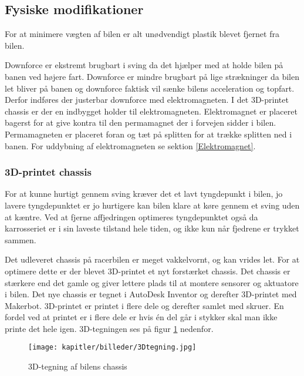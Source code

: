 
\subsection{Fysiske modifikationer}

For at minimere vægten af bilen er alt unødvendigt plastik blevet fjernet fra bilen.

Downforce er ekstremt brugbart i sving da det hjælper med at holde bilen på banen ved højere fart. Downforce er mindre brugbart på lige strækninger da bilen let bliver på banen og downforce faktisk vil sænke bilens acceleration og topfart. Derfor indføres der justerbar downforce med elektromagneten. I det 3D-printet chassis er der en indbygget holder til elektromagneten. Elektromagnet er placeret bagerst for at give kontra til den permamagnet der i forvejen sidder i bilen. Permamagneten er placeret foran og tæt på splitten for at trække splitten ned i banen. For uddybning af elektromagneten se sektion \ref{Elektromagnet}.

\subsubsection{3D-printet chassis}

For at kunne hurtigt gennem sving kræver det et lavt tyngdepunkt i bilen, jo lavere tyngdepunktet er jo hurtigere kan bilen klare at køre gennem et sving uden at kæntre. Ved at fjerne affjedringen optimeres tyngdepunktet også da karrosseriet er i sin laveste tilstand hele tiden, og ikke kun når fjedrene er trykket sammen.

Det udleveret chassis på racerbilen er meget vakkelvornt, og kan vrides let. For at optimere dette er der blevet 3D-printet et nyt forstærket chassis. Det chassis er stærkere end det gamle og giver lettere plads til at montere sensorer og aktuatore i bilen. Det nye chassis er tegnet i AutoDesk Inventor og derefter 3D-printet med Makerbot. 3D-printet er printet i flere dele og derefter samlet med skruer. En fordel ved at printet er i flere dele er hvis én del går i stykker skal man ikke printe det hele igen. 3D-tegningen ses på figur \ref{fig:3Dtegning} nedenfor.

\begin{figure}[ht]
    \centering
    \texttt{[image: kapitler/billeder/3Dtegning.jpg]}
    \caption{3D-tegning af bilens chassis}
    \label{fig:3Dtegning}
\end{figure}


